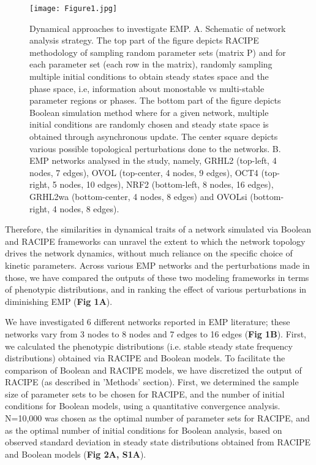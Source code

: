 \documentclass[preprint,review,12pt]{elsarticle}
\begin{document}
	 
	\begin{figure}[!ht]
		\centering
		\texttt{[image: Figure1.jpg]}
		\caption{Dynamical approaches to investigate EMP. A. Schematic of network analysis strategy. \color{red} The top part of the figure depicts RACIPE methodology of sampling random parameter sets (matrix P) and for each parameter set (each row in the matrix), randomly sampling multiple initial conditions to obtain steady states space and the phase space, i.e, information about monostable vs multi-stable parameter regions or phases.  The bottom part of the figure depicts Boolean simulation method where for a given network, multiple initial conditions are randomly chosen and steady state space is obtained through asynchronous update. The center square depicts various possible topological perturbations done to the networks. 
			B.  EMP networks analysed in the study, namely, GRHL2 (top-left, 4 nodes, 7 edges), OVOL (top-center, 4 nodes, 9 edges), OCT4 \cite{Jolly2016} (top-right, 5 nodes, 10 edges), NRF2 \cite{Bocci2019} (bottom-left, 8 nodes, 16 edges), GRHL2wa (bottom-center, 4 nodes, 8 edges) and OVOLsi \cite{Jolly2016} (bottom-right, 4 nodes, 8 edges).
		}
		\label{figure1}
	\end{figure}


	Therefore, the similarities in dynamical traits of a network simulated via Boolean and RACIPE frameworks can unravel the extent to which the network topology drives the network dynamics, without much reliance on the specific choice of kinetic parameters. Across various EMP networks and the perturbations made in those, we have compared the outputs of these two modeling frameworks in terms of phenotypic distributions, and in ranking the effect of various perturbations in diminishing EMP (\textbf{Fig 1A}).
	
	We have investigated 6 different networks reported in EMP literature; these networks vary from 3 nodes to 8 nodes and 7 edges to 16 edges (\textbf{Fig 1B}). First, we calculated the phenotypic distributions (i.e. stable steady state frequency distributions) obtained via RACIPE and Boolean models. To facilitate the comparison of Boolean and RACIPE models, we have discretized the output of RACIPE (as described in 'Methods' section). First, we determined the sample size of parameter sets to be chosen for RACIPE, and the number of initial conditions for Boolean models, using a quantitative convergence analysis. N=10,000 was chosen as the optimal number of parameter sets for RACIPE, and as the optimal number of initial conditions for Boolean analysis, based on observed standard deviation in steady state distributions obtained from RACIPE and Boolean models (\textbf{Fig 2A, S1A}).
	
\end{document}
